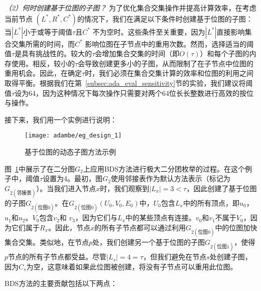 \textit{（2）何时创建基于位图的子图？ }为了优化集合交集操作并提高计算效率，在考虑当前节点 $(L^*, R^*, C^*)$的情况下，我们在满足以下条件时创建基于位图的子图：当$|L^*|$小于或等于阈值$\tau$且$C^*$ 不为空时。这些条件至关重要，因为$|L^*|$直接影响集合交集所需的时间，而$C^*$ 影响位图在子节点中的重用次数。然而，选择适当的阈值$\tau$是具有挑战性的。较大的$\tau$会增加集合交集的时间（即$O(\tau)$）和每个子图的内存使用。相反，较小的$\tau$会导致创建更多小的子图，从而限制了在子节点中位图的重用机会。因此，在确定$\tau$时，我们必须在集合交集计算的效率和位图的利用之间取得平衡。根据我们在第~\ref{subsec:ada_eval_sensitivity}节的实验，我们建议将阈值$\tau$设为64，因为这种情况下每次操作只需要对两个64位长长整数进行高效的按位与操作。

接下来，我们用一个实例进行说明：

\begin{figure} [H]
	\centering
  \vspace{0.05in}
	\texttt{[image: adambe/eg\_design\_1]}
  \vspace{0.02in}
	\caption{基于位图的动态子图方法示例}

	\label{fig:ada_design1}
\end{figure}

\begin{example}
  图~\ref{fig:ada_design1}中展示了在二分图$G_2$上应用BDS方法进行极大二分团枚举的过程。在这个例子中，阈值$\tau$设置为4。最初，图$G_2$使用邻接表作为默认方法表示（标记为$G_{2(邻接表)}$）。当我们进入节点$x$时，我们观察到$|L_x| = 3 < \tau$，因此创建了基于位图的子图$G_{2(位图0)}$。在$G_{2(位图0)}(U_0, V_0, E_0)$中，$U_0$包含$L_x$中的所有顶点，即$u_0$，$u_1$和$u_2$。$V_0$包含$v_2$和 $v_3$，因为它们与$L_x$中的某些顶点有连接。$v_0$和$v_1$不属于$V_0$，因为它们属于$R_x$。因此，节点$x$的所有子节点都可以通过利用$G_{2(位图0)}$中的位图加快集合交集。类似地，在节点$p$处，我们创建另一个基于位图的子图$G_{2(位图1)}$，使得$p$节点的所有子节点都受益。尽管$|L_s| = 4 = \tau$，但我们避免在节点$s$处创建子图，因为$C_s$为空，这意味着如果此位图被创建，将没有子节点可以重用此位图。
  
\end{example}

  BDS方法的主要贡献包括以下两点：


